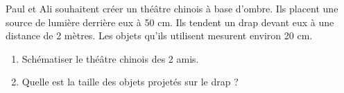 
Paul et Ali souhaitent créer un théâtre chinois à base d'ombre. Ils placent une source de lumière derrière eux à 50 cm. Ils tendent un drap devant eux à une distance de 2 mètres. Les objets qu'ils utilisent mesurent environ 20 cm. 

\begin{enumerate}
\item Schématiser le théâtre chinois des 2 amis.
\item Quelle est la taille des objets projetés sur le drap ?
\end{enumerate}



